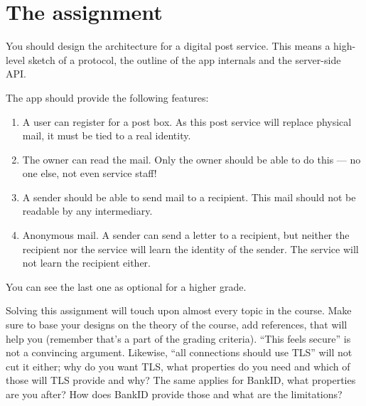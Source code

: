 \section*{The assignment}

You should design the architecture for a digital post service.
This means a high-level sketch of a protocol, the outline of the app internals 
and the server-side API\@.

The app should provide the following features:
\begin{enumerate}
  \item A user can register for a post box.
    As this post service will replace physical mail, it must be tied to a real 
    identity.

  \item The owner can read the mail.
    Only the owner should be able to do this --- no one else, not even service 
    staff!

  \item A sender should be able to send mail to a recipient.
    This mail should not be readable by any intermediary.

  \item Anonymous mail.
    A sender can send a letter to a recipient, but neither the recipient nor 
    the service will learn the identity of the sender.
    The service will not learn the recipient either.
\end{enumerate}
You can see the last one as optional for a higher grade.

Solving this assignment will touch upon almost every topic in the course.
Make sure to base your designs on the theory of the course, add references, 
that will help you (remember that's a part of the grading criteria).
\enquote{This feels secure} is not a convincing argument.
Likewise, \enquote{all connections should use TLS} will not cut it either; why 
do you want TLS, what properties do you need and which of those will TLS 
provide and why?
The same applies for BankID, what properties are you after?
How does BankID provide those and what are the limitations?

